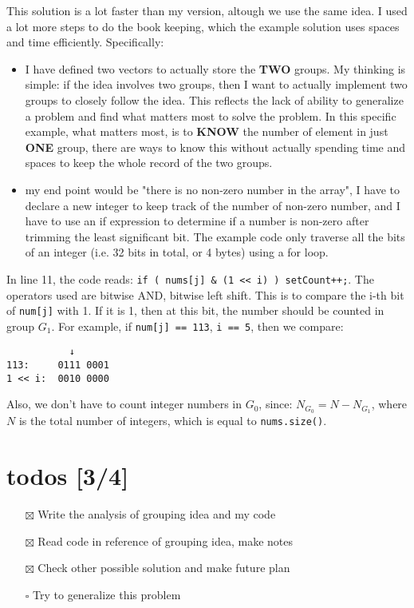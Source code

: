 \documentclass[12pt]{book}
\begin{document}
This solution is a lot faster than my version, altough we use the same idea. I used a lot more steps to do the book keeping, which the example solution uses spaces and time efficiently. Specifically:
\begin{itemize}
\item I have defined two vectors to actually store the \textbf{TWO} groups. My thinking is simple: if the idea involves two groups, then I want to actually implement two groups to closely follow the idea. This reflects the lack of ability to generalize a problem and find what matters most to solve the problem. In this specific example, what matters most, is to \textbf{KNOW} the number of element in just \textbf{ONE} group, there are ways to know this without actually spending time and spaces to keep the whole record of the two groups.
\item my end point would be "there is no non-zero number in the array", I have to declare a new integer to keep track of the number of non-zero number, and I have to use an if expression to determine if a number is non-zero after trimming the least significant bit.  The example code only traverse all the bits of an integer (i.e. 32 bits in total, or 4 bytes) using a for loop.
\end{itemize}

In line 11, the code reads: \texttt{if ( nums[j] \& (1 << i) ) setCount++;}. The operators used are bitwise AND, bitwise left shift. This is to compare the i-th bit of \texttt{num[j]} with 1. If it is 1, then at this bit, the number should be counted in group \(G_1\). For example, if \texttt{num[j] == 113}, \texttt{i == 5}, then we compare:
\begin{verbatim}
           ↓
113:     0111 0001
1 << i:  0010 0000
\end{verbatim}

Also, we don't have to count integer numbers in \(G_0\), since: \(N_{G_0} = N - N_{G_1}\), where \(N\) is the total number of integers, which is equal to \texttt{nums.size()}.

\section{todos [3/4]}
\label{sec:org58c2ec4}
\begin{itemize}
\item[{$\boxtimes$}] Write the analysis of grouping idea and my code
\item[{$\boxtimes$}] Read code in reference of grouping idea, make notes
\item[{$\boxtimes$}] Check other possible solution and make future plan
\item[{$\square$}] Try to generalize this problem
\end{itemize}
\end{document}

